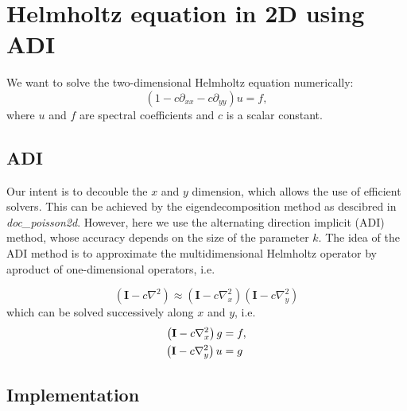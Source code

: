 \documentclass[10pt,a4paper]{article}
\begin{document}
\section*{Helmholtz equation in 2D using ADI}
We want to solve the two-dimensional Helmholtz equation numerically:
\begin{equation}
(1  - c \partial_{xx} - c \partial_{yy}) u = f,
\end{equation}
where $u$ and $f$ are spectral coefficients and $c$ is a scalar constant. 

\subsection*{ADI}
Our intent is to decouble the $x$ and $y$ dimension, which allows the use of efficient solvers. This can be achieved by the eigendecomposition method as descibred in \textit{doc\_poisson2d}. However, here we use the alternating direction implicit (ADI) method, whose accuracy depends on the size of the parameter $k$. The idea of the ADI method is to approximate the multidimensional Helmholtz operator by aproduct of one-dimensional operators, i.e. 

\begin{equation}
    \left(\mathbf{I} - c\nabla^2\right) \approx \left( \mathbf{I} - c\nabla^2_{x} \right) \left( \mathbf{I} - c\nabla^2_{y} \right)
    \label{eq:2}
\end{equation}
which can be solved successively along $x$ and $y$, i.e.
\begin{align}
     \left( \mathbf{I} - c\nabla^2_{x} \right) g &= f, \notag\\
     \left( \mathbf{I} - c\nabla^2_{y} \right) u &= g
     \label{eq:3}
\end{align}

\subsection*{Implementation}
\end{document}

